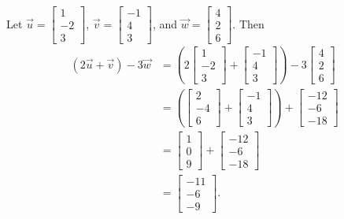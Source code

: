 \begin{example}
	Let $\vec{u} = \begin{bmatrix} 1 \\ -2 \\ 3 \end{bmatrix}$,
	$\vec{v} = \begin{bmatrix} -1 \\ 4 \\ 3 \end{bmatrix}$, and
	$\vec{w} = \begin{bmatrix} 4 \\ 2 \\ 6 \end{bmatrix}$.
	Then
	\begin{align*}
		(2\vec{u} + \vec{v}) - 3\vec{w} &= \left(2\begin{bmatrix} 1 \\ -2 \\ 3 \end{bmatrix} + \begin{bmatrix} -1 \\ 4 \\ 3 \end{bmatrix}\right) - 3\begin{bmatrix} 4 \\ 2 \\ 6 \end{bmatrix} \\
		&= \left(\begin{bmatrix}2 \\ -4 \\ 6\end{bmatrix} + \begin{bmatrix} -1 \\ 4 \\ 3 \end{bmatrix}\right) + \begin{bmatrix}-12 \\ -6 \\ -18\end{bmatrix} \\
		&= \begin{bmatrix}1 \\ 0 \\ 9\end{bmatrix} + \begin{bmatrix}-12 \\ -6 \\ -18\end{bmatrix} \\
		&= \begin{bmatrix}-11 \\ -6 \\ -9\end{bmatrix}.
	\end{align*}
\end{example}

